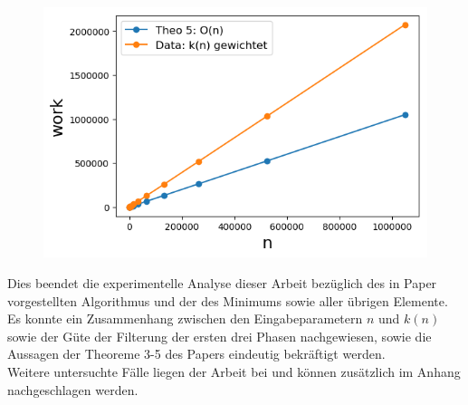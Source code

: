 \begin{figure}[H]
\begin{minipage}[t]{.30\textwidth}
    \end{minipage}
    \hspace*{.8cm}
    \begin{minipage}[t]{.30\textwidth}
        \centering
        \includegraphics[width=1.25\textwidth]{pictures/min_theo5_work_weigh_pred.png}
    \end{minipage}
    \vspace*{-0.1cm}
    \label{fig: min_theo5_fit_rem}
\end{figure}

\noindent
Dies beendet die experimentelle Analyse dieser Arbeit bezüglich des in Paper~\cite{meyer1} vorgestellten Algorithmus \Rm und der \fg des Minimums sowie aller übrigen Elemente.\\[.1cm]
Es konnte ein Zusammenhang zwischen den Eingabeparametern $n$ und $k(n)$ sowie der Güte der Filterung der ersten drei Phasen nachgewiesen, sowie die Aussagen der Theoreme 3-5 des Papers eindeutig bekräftigt werden.\\[.1cm]
Weitere untersuchte Fälle liegen der Arbeit bei und können zusätzlich im Anhang nachgeschlagen werden. 

